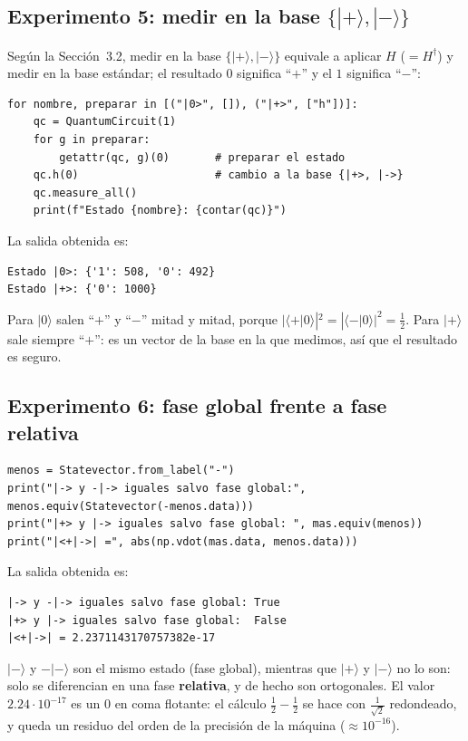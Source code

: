 \documentclass[11pt, a4paper, twoside, openright]{report}
\begin{document}
\subsection{Experimento 5: medir en la base $\{|+\rangle, |-\rangle\}$}

\noindent Según la Sección~3.2, medir en la base $\{|+\rangle,|-\rangle\}$ equivale a aplicar $H$ ($=H^\dagger$) y medir en la base estándar; el resultado $0$ significa ``$+$'' y el $1$ significa ``$-$'':
\begin{lstlisting}
for nombre, preparar in [("|0>", []), ("|+>", ["h"])]:
    qc = QuantumCircuit(1)
    for g in preparar:
        getattr(qc, g)(0)       # preparar el estado
    qc.h(0)                     # cambio a la base {|+>, |->}
    qc.measure_all()
    print(f"Estado {nombre}: {contar(qc)}")
\end{lstlisting}
\noindent La salida obtenida es:
\begin{lstlisting}[language={}]
Estado |0>: {'1': 508, '0': 492}
Estado |+>: {'0': 1000}
\end{lstlisting}
\noindent Para $|0\rangle$ salen ``$+$'' y ``$-$'' mitad y mitad, porque $|\langle+|0\rangle|^2 = |\langle-|0\rangle|^2 = \frac12$. Para $|+\rangle$ sale siempre ``$+$'': es un vector de la base en la que medimos, así que el resultado es seguro.

\subsection{Experimento 6: fase global frente a fase relativa}

\begin{lstlisting}
menos = Statevector.from_label("-")
print("|-> y -|-> iguales salvo fase global:", menos.equiv(Statevector(-menos.data)))
print("|+> y |-> iguales salvo fase global: ", mas.equiv(menos))
print("|<+|->| =", abs(np.vdot(mas.data, menos.data)))
\end{lstlisting}
\noindent La salida obtenida es:
\begin{lstlisting}[language={}]
|-> y -|-> iguales salvo fase global: True
|+> y |-> iguales salvo fase global:  False
|<+|->| = 2.2371143170757382e-17
\end{lstlisting}
\noindent $|-\rangle$ y $-|-\rangle$ son el mismo estado (fase global), mientras que $|+\rangle$ y $|-\rangle$ no lo son: solo se diferencian en una fase \textbf{relativa}, y de hecho son ortogonales. El valor $2.24\cdot10^{-17}$ es un $0$ en coma flotante: el cálculo $\frac12 - \frac12$ se hace con $\frac{1}{\sqrt2}$ redondeado, y queda un residuo del orden de la precisión de la máquina ($\approx 10^{-16}$).
\end{document}
